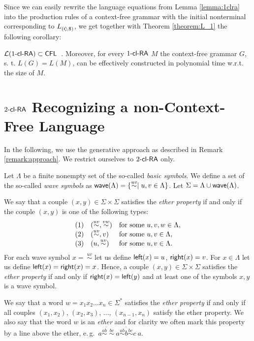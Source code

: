 Since we can easily rewrite the language equations from Lemma \ref{lemma:1clra}
into the production rules of a context-free grammar with the initial nonterminal corresponding to $L_{({\small \cent},\$)}$,
we get together with Theorem \ref{theorem:L_1} the following corollary:

\begin{corollary}\label{corollary:1clra_cfl}
$\calL{\kclRA[1]} \subset \CFL$\ . Moreover, for every $\kclRA[1]$ $M$ the context-free grammar $G$, s. t. $L(G) = L(M)$, can be effectively constructed in polynomial time w.r.t. the size of $M$.
\end{corollary}

\section[\texorpdfstring{$\kclRA[2]$ Recognizing a non-Context-Free Language}%
                        {2-cl-RA Recognizing a non-CFL}]%
                        {$\kclRA[2]$ Recognizing a non-Context-Free Language}%
\label{2clRA-non-CFL}
\index{$\kclRA[2]$}

In the following, we use the generative approach as described in Remark \ref{remark:approach}. We restrict ourselves to $\kclRA[2]$ only.

\begin{definition}\label{definition:ether}
Let $\Lambda$ be a finite nonempty set of the so-called \emph{basic symbols}. We define a set of the so-called \emph{wave symbols} as $\wave(\Lambda) = \{\stackrel{uv}{\sim} \mid u,v \in \Lambda\}$. Let $\Sigma = \Lambda \cup \wave(\Lambda)$.

We say that a couple $(x, y) \in \Sigma \times \Sigma$ satisfies the \emph{ether property} if and only if the couple $(x, y)$ is one of the following types:
$$
\begin{array}{ll}
(1) \quad (\stackrel{uv}{\sim}, \stackrel{vw}{\sim})    & \textup{for some } u, v, w \in \Lambda,\\
(2) \quad (\stackrel{uv}{\sim}, v)                  & \textup{for some } u, v \in \Lambda,\\
(3) \quad (u, \stackrel{uv}{\sim})                  & \textup{for some } u, v \in \Lambda.
\end{array}
$$
For each wave symbol $x =\ \stackrel{uv}{\sim}$ let us define ${\sf left}(x) = u$, ${\sf right}(x) = v$. For $x \in \Lambda$ let us define ${\sf left}(x) = {\sf right}(x) = x$. Hence, a couple $(x, y) \in \Sigma \times \Sigma$ satisfies the \emph{ether property} if and only if ${\sf right}(x) = {\sf left}(y)$ and at least one of the symbols $x, y$ is a wave symbol.

We say that a word $w = x_1 x_2 \ldots x_n \in \Sigma^*$ satisfies the \emph{ether property} if and only if all couples $(x_1, x_2)$, $(x_2, x_3)$, ..., $(x_{n-1}, x_n)$ satisfy the ether property. We also say that the word $w$ is an \emph{ether} and for clarity we often mark this property by a line above the ether, e.\,g.\ $\overline{a \stackrel{ab}{\sim} \; \stackrel{bc}{\sim}}\ \overline{a \stackrel{ab}{\sim} b \stackrel{bc}{\sim} c}\ a$.
\end{definition}

